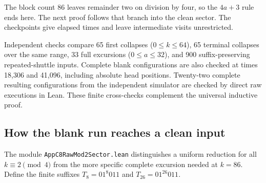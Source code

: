 \documentclass[11pt]{article}
\DeclareRobustCommand{\_}{\ifmmode\sb\else\textunderscore\allowbreak\fi}
\theoremstyle{definition}
\theoremstyle{remark}
\begin{document}
The block count 86 leaves remainder two on division by four, so the $4a+3$ rule ends here. The next proof follows that branch into the clean sector. The checkpoints give elapsed times and leave intermediate visits unrestricted.

Independent checks compare 65 first collapses ($0\le k\le64$), 65 terminal collapses over the same range, 33 full excursions ($0\le a\le32$), and 900 suffix-preserving repeated-shuttle inputs. Complete blank configurations are also checked at times 18,306 and 41,096, including absolute head positions. Twenty-two complete resulting configurations from the independent simulator are checked by direct raw executions in Lean. These finite cross-checks complement the universal inductive proof.

\subsection{How the blank run reaches a clean input}
\label{sec:appc8mod2}
The module \texttt{AppC8RawMod2Sector.lean} distinguishes a uniform reduction for all $k\equiv2\pmod4$ from the more specific complete excursion needed at $k=86$. Define the finite suffixes $T_8=01^8 011$ and $T_{26}=01^{26}011$.
\end{document}
